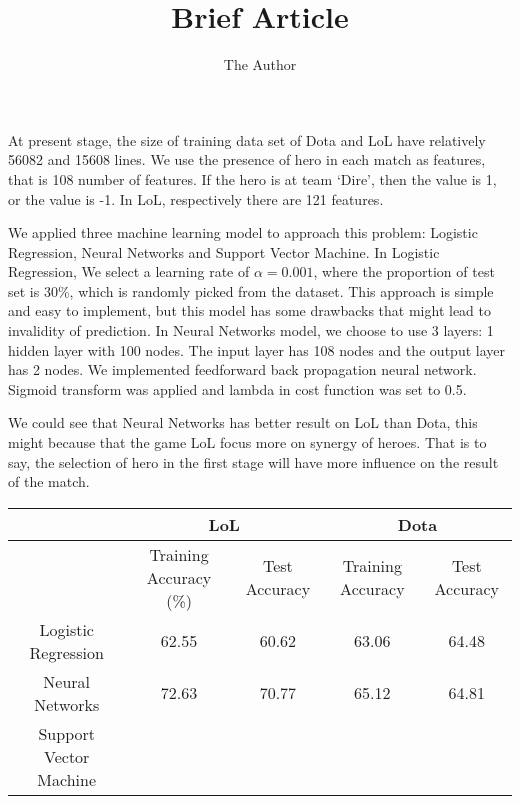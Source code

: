 \documentclass[11pt, oneside]{article}   	%
\title{Brief Article}
\author{The Author}
\begin{document}
\maketitle
At present stage, the size of training data set of Dota and LoL have relatively 56082 and 15608 lines. We use the presence of hero in each match as features, that is 108 number of features. If the hero is at team `Dire', then the value is 1, or the value is -1. In LoL, respectively there are 121 features. 

We applied three machine learning model to approach this problem: Logistic Regression, Neural Networks and Support Vector Machine. In Logistic Regression, We select a learning rate of $\alpha = 0.001$, where the proportion of test set is 30\%, which is randomly picked from the dataset. This approach is simple and easy to implement, but this model has some drawbacks that might lead to invalidity of prediction. In Neural Networks model, we choose to use 3 layers: 1 hidden layer with 100 nodes. The input layer has 108 nodes and the output layer has 2 nodes. We implemented feedforward back propagation neural network. Sigmoid transform was applied and lambda in cost function was set to 0.5. 

We could see that Neural Networks has better result on LoL than Dota, this might because that the game LoL focus more on synergy of heroes. That is to say, the selection of hero in the first stage will have more influence on the result of the match.

\begin{table}[h]
\begin{tabular}{c c c c c}
\hline
\toprule
                       & \multicolumn{2}{c}{LoL}    & \multicolumn{2}{c}{Dota}   \\ 
\midrule
                       & Training Accuracy (\%) & Test Accuracy & Training Accuracy & Test Accuracy \\ \hline
Logistic Regression    & 62.55         & 60.62     & 63.06         & 64.48     \\ \hline
Neural Networks        & 72.63        & 70.77     & 65.12        &64.81     \\ \hline
Support Vector Machine &                &            &                &            \\ 
\bottomrule
\end{tabular}
\end{table}
\end{document}
